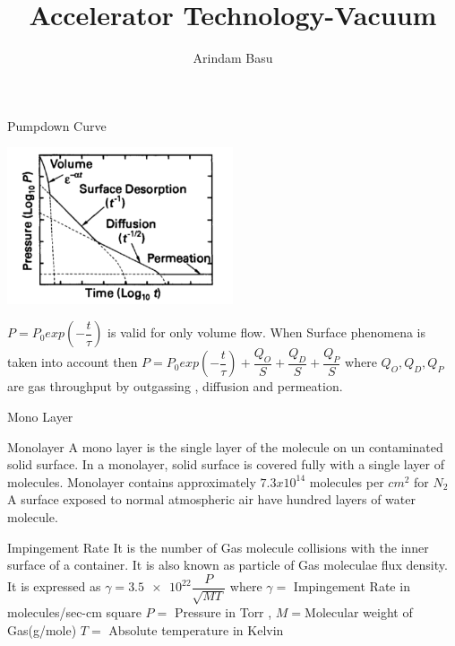 \documentclass[11]{beamer}
\author{Arindam Basu \hspace{5 cm}\newline{arindam@barc.gov.in}}
\title{Accelerator Technology-Vacuum \newline{Vacuum Introduction Part-2} \newline{Surface Phenomena}}
\begin{document}
\begin{frame}
\titlepage
\end{frame}



\begin{frame}{Pumpdown Curve}

\begin{center}
   			\includegraphics[width=0.5\textwidth]{PD.png}
   			
\end{center}
$P=P_{0}exp(-\dfrac{t}{\tau})  $ is valid for only volume flow. When Surface phenomena is taken into account then 
$P=P_{0}exp(-\dfrac{t}{\tau})+\dfrac{Q_{O}}{S} +\dfrac{Q_{D}}{S} +\dfrac{Q_{P}}{S} $ where $Q_{O},Q_{D},Q_{P}$ are gas throughput by outgassing , diffusion and permeation.
\end{frame}



\begin{frame}{Mono Layer}

\begin{exampleblock}{Monolayer}
A mono layer is the single layer of the molecule on un contaminated solid surface.\break
In a monolayer, solid surface is covered fully with a single layer of molecules.
Monolayer contains approximately $ 7.3 x 10^{14} $ molecules per $cm^2$  for $ N_2 $ \break
A surface exposed to normal atmospheric air have hundred layers of water molecule.
\end{exampleblock}

\begin{exampleblock}{Impingement Rate}
It is the number of Gas molecule collisions with the inner surface of a container. It is also known as particle of Gas moleculae flux density.
It is expressed as $\gamma = \num[round-precision=2,round-mode=figures,scientific-notation=true]{3.5e22} \dfrac{P}{\sqrt{MT}} $ where  $\gamma = $ Impingement Rate in molecules/sec-cm square  $P=$ Pressure in Torr , $M=$Molecular weight of Gas(g/mole) $T=$ Absolute temperature in Kelvin
\end{exampleblock}

\end{frame}
\end{document}
